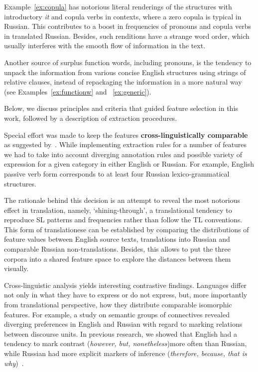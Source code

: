 Example~\cref{ex:copula} has notorious literal renderings of the structures with introductory \textit{it} and copula verbs in contexts, where a zero copula is typical in Russian. This contributes to a boost in frequencies of pronouns and copula verbs in translated Russian. Besides, such renditions have a strange word order, which usually interferes with the smooth flow of information in the text.

Another source of surplus function words, including pronouns, is the tendency to unpack the
information from various concise English structures using strings of relative clauses, instead of
repackaging the information in a more natural way (see Examples~\cref{ex:functionw} and ~\cref{ex:generic}). 

Below, we discuss principles and criteria that guided feature selection in this work, followed by a description of extraction procedures. 

Special effort was made to keep the features \textbf{cross-linguistically comparable} as suggested by~\citet{Evert2017}. 
While implementing extraction rules for a number of features we had to take into account diverging annotation rules and possible variety of expression for a given category in either English or Russian. For example, English passive verb form corresponds to at least four Russian lexico-grammatical structures. 

The rationale behind this decision is an attempt to reveal the most notorious effect in translation, namely, `shining-through', a translational tendency to reproduce SL patterns and frequencies rather than follow the TL conventions. This form of translationese can be established by comparing the distributions of feature values between English source texts, translations into Russian and comparable Russian non-translations. Besides, this allows to put the three corpora into a shared feature space to explore the  distances between them visually.

Cross-linguistic analysis yields interesting contrastive findings. Languages differ not only in what they have to express or do not express, but, more importantly from translational perspective, how they distribute comparable isomorphic features. For example, a study on semantic groups of connectives revealed diverging preferences in English and Russian with regard to marking relations between discourse units. 
In previous research, we showed that English had a tendency to mark contrast (\textit{however, but, nonetheless})more often than Russian, while Russian had more explicit markers of inference (\textit{therefore, because, that is why})~\cite{Kunilovskaya2017conn}.   

